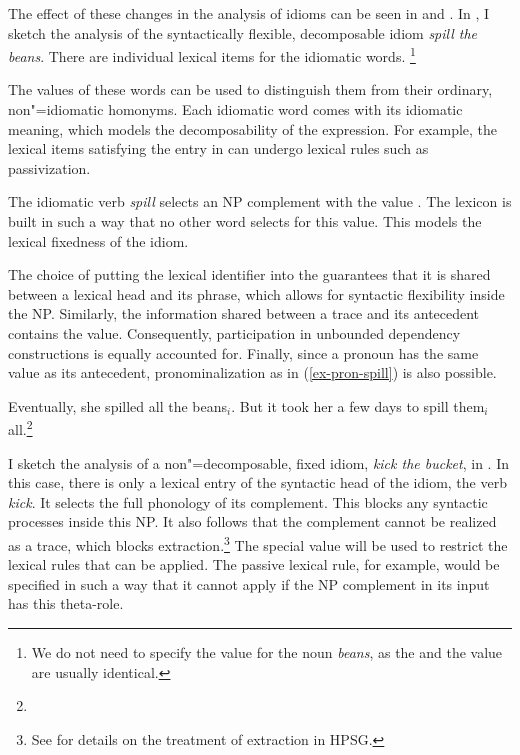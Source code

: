 \documentclass[output=paper
 	        ,biblatex
                ,babelshorthands
                ,newtxmath
                ,draftmode
                ,colorlinks, citecolor=brown
]{langscibook}
\begin{document}
The effect of these changes in the analysis of idioms can be seen in  and . In , I sketch the analysis of the syntactically flexible, decomposable idiom \emph{spill the beans}.  There are individual lexical items for the idiomatic words.%
\footnote{We do not need to specify the  value for the noun \emph{beans}, as the  and the  value are usually identical.}

\eal %
\label{ke-spill}
\ex 
\label{le-idiomatic-spill}
\ex 
{}
\zl 

\noindent
The  values of these words can be used to distinguish them from their ordinary,
non"=idiomatic homonyms.  Each idiomatic word comes with its idiomatic meaning, which models the
decomposability of the expression.  For example, the lexical items satisfying the entry in
 can undergo lexical rules such as passivization.

The idiomatic verb \emph{spill} selects an NP complement with the  value
.  The lexicon is built in such a way that no other word selects for this
 value.  This models the lexical fixedness of the idiom.

The choice of putting the lexical identifier into the  guarantees that it is shared
between a lexical head and its phrase, which allows for syntactic flexibility inside the NP.
Similarly, the information shared between a trace and its antecedent contains the 
value. Consequently, participation in unbounded dependency constructions is equally accounted for.
Finally, since a pronoun has the same  value as its antecedent, pronominalization as in
(\ref{ex-pron-spill}) is also possible.

\ea
 \label{ex-pron-spill}
Eventually, she spilled all the beans$_i$. But it took her a few days to spill them$_i$
all.\footnote{
}
\z

I sketch the analysis of a non"=decomposable, fixed idiom, \emph{kick the bucket}, in
.  In this case, there is only a lexical entry of the syntactic head of the idiom,
the verb \emph{kick}.  It selects the full phonology of its complement. This blocks any syntactic
processes inside this NP. It also follows that the complement cannot be realized as a trace, which
blocks extraction.\footnote{See  for
  details on the treatment of extraction in HPSG.}  
%
The special  value  will be used to restrict the lexical rules that can
be applied.  The passive lexical rule, for example, would be specified in such a way that it cannot
apply if the NP complement in its input has this theta-role.
\end{document}
